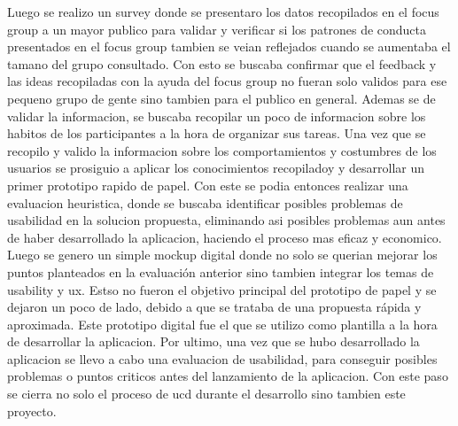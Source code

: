Luego se realizo un survey donde se presentaro los datos recopilados en el focus group a un mayor publico para validar y verificar si los patrones de conducta presentados en el focus group tambien se veian reflejados cuando se aumentaba el tamano del grupo consultado. Con esto se buscaba confirmar que el feedback y las ideas recopiladas con la ayuda del focus group no fueran solo validos para ese pequeno grupo de gente sino tambien para el publico en general. Ademas se de validar la informacion, se buscaba recopilar un poco de informacion sobre los habitos de los participantes a la hora de organizar sus tareas.
Una vez que se recopilo y valido la informacion sobre los comportamientos y costumbres de los usuarios se prosiguio a aplicar los conocimientos recopiladoy y desarrollar un primer prototipo rapido de papel. Con este se podia entonces realizar una evaluacion heuristica, donde se buscaba identificar posibles problemas de usabilidad en la solucion propuesta, eliminando asi posibles problemas aun antes de haber desarrollado la aplicacion, haciendo el proceso mas eficaz y economico.
Luego se genero un simple mockup digital donde no solo se querian mejorar los puntos planteados en la evaluación anterior sino tambien integrar los temas de usability y ux. Estso no fueron el objetivo principal del prototipo de papel y se dejaron un poco de lado, debido a que se trataba de una propuesta rápida y aproximada. Este prototipo digital fue el que se utilizo como plantilla a la hora de desarrollar la aplicacion. 
Por ultimo, una vez que se hubo desarrollado la aplicacion se llevo a cabo una evaluacion de usabilidad, para conseguir posibles problemas o puntos criticos antes del lanzamiento de la aplicacion. Con este paso se cierra no solo el proceso de ucd durante el desarrollo sino tambien este proyecto. 
